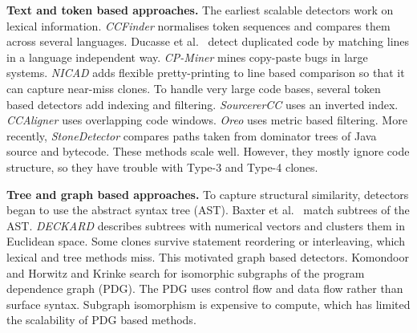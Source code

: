 \documentclass[authoryear,final,5p,times,twocolumn]{elsarticle}
\theoremstyle{plain}
\begin{document}
\textbf{Text and token based approaches.} The earliest scalable detectors
work on lexical information. \emph{CCFinder} \cite{kamiya2002ccfinder}
normalises token sequences and compares them across several languages.
Ducasse et al.\ \cite{ducasse1999language} detect duplicated code by
matching lines in a language independent way. \emph{CP-Miner}
\cite{li2006cpminer} mines copy-paste bugs in large systems.
\emph{NICAD} \cite{roy2008nicad} adds flexible pretty-printing to line
based comparison so that it can capture near-miss clones. To handle very
large code bases, several token based detectors add indexing and
filtering. \emph{SourcererCC} \cite{sajnani2016sourcerercc} uses an
inverted index. \emph{CCAligner} \cite{wang2018ccaligner} uses
overlapping code windows. \emph{Oreo} \cite{saini2018oreo} uses metric
based filtering. More recently, \emph{StoneDetector}
\cite{heinze2025stonedetector} compares paths taken from dominator trees
of Java source and bytecode. These methods scale well. However, they
mostly ignore code structure, so they have trouble with Type-3 and
Type-4 clones.

\textbf{Tree and graph based approaches.} To capture structural
similarity, detectors began to use the abstract syntax tree (AST).
Baxter et al.\ \cite{baxter1998clone} match subtrees of the AST.
\emph{DECKARD} \cite{jiang2007deckard} describes subtrees with numerical
vectors and clusters them in Euclidean space. Some clones survive
statement reordering or interleaving, which lexical and tree methods miss.
This motivated graph based detectors. Komondoor and Horwitz
\cite{komondoor2001slicing} and Krinke \cite{krinke2001identifying} search
for isomorphic subgraphs of the program dependence graph (PDG). The PDG
uses control flow and data flow rather than surface syntax. Subgraph
isomorphism is expensive to compute, which has limited the scalability of
PDG based methods.
\end{document}
